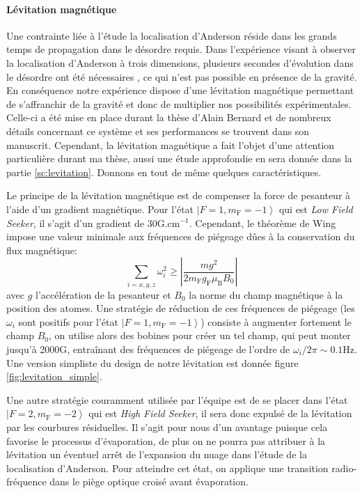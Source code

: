 \paragraph*{Lévitation magnétique}
Une contrainte liée à l'étude la localisation d'Anderson réside dans les grands temps de propagation dans le désordre requis. Dans l'expérience visant à observer la localisation d'Anderson à trois dimensions, plusieurs secondes d'évolution dans le désordre ont été nécessaires \citep{jendrzejewski2012three}, ce qui n'est pas possible en présence de la gravité. En conséquence notre expérience dispose d'une lévitation magnétique permettant de s'affranchir de la gravité et donc de multiplier nos possibilités expérimentales. Celle-ci a été mise en place durant la thèse d'Alain Bernard et de nombreux détails concernant ce système et ses performances se trouvent dans son manuscrit. Cependant, la lévitation magnétique a fait l'objet d'une attention particulière durant ma thèse, aussi une étude approfondie en sera donnée dans la partie \ref{sc:levitation}. Donnons en tout de même quelques caractéristiques.

Le principe de la lévitation magnétique est de compenser la force de pesanteur à l'aide d'un gradient magnétique. Pour l'état $\left| F=1, m_{\mathrm{F}}=-1 \right\rangle$ qui est \emph{Low Field Seeker}, il s'agit d'un gradient de 30G.cm${}^{-1}$. Cependant, le théorème de Wing impose une valeur minimale aux fréquences de piégeage dûes à la conservation du flux magnétique:
\begin{equation}
\sum_{i=x,y,z} \omega_i^2 \geq \left| \frac{mg^2}{2m_{\mathrm{F}} g_{\mathrm{F}} \mu_{\mathrm{B}} B_0}\right|
\end{equation} 
avec $g$ l'accélération de la pesanteur et $B_0$ la norme du champ magnétique à la position des atomes. Une stratégie de réduction de ces fréquences de piégeage (les $\omega_i$ sont positifs pour l'état $\left|F=1, m_{\mathrm{F}}=-1 \right\rangle$) consiste à augmenter fortement le champ $B_0$, on utilise alors des bobines pour créer un tel champ, qui peut monter jusqu'à 2000G, entraînant des fréquences de piégeage de l'ordre de $\omega_i /2 \pi \sim 0.1$Hz. Une version simpliste du design de notre lévitation est donnée figure \ref{fig:levitation_simple}.

Une autre stratégie couramment utilisée par l'équipe est de se placer dans l'état $\left|F=2,m_{\mathrm{F}}=-2 \right\rangle$ qui est \textit{High Field Seeker}, il sera donc expulsé de la lévitation par les courbures résiduelles. Il s'agit pour nous d'un avantage puisque cela favorise le processus d'évaporation, de plus on ne pourra pas attribuer à la lévitation un éventuel arrêt de l'expansion du nuage dans l'étude de la localisation d'Anderson. Pour atteindre cet état, on applique une transition radio-fréquence dans le piège optique croisé avant évaporation.

